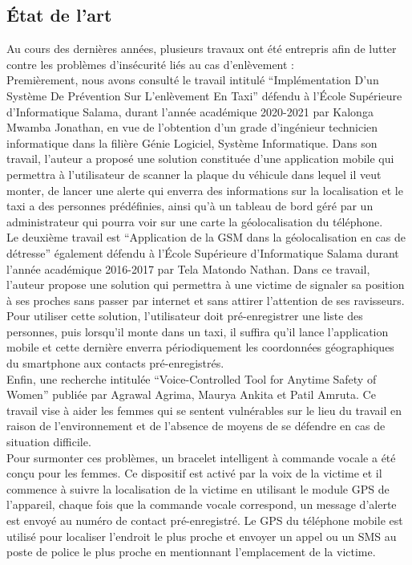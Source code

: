 \subsection{État de l'art}
Au cours des dernières années, plusieurs travaux ont été entrepris afin de lutter contre les problèmes d'insécurité liés au cas d'enlèvement : \\

Premièrement, nous avons consulté le travail intitulé “Implémentation D'un Système De Prévention Sur L'enlèvement En Taxi” défendu à l’École Supérieure d’Informatique Salama, durant l’année académique 2020-2021 par Kalonga Mwamba Jonathan, en vue de l’obtention d’un grade d’ingénieur technicien informatique dans la filière Génie Logiciel, Système Informatique. Dans son travail, l’auteur a proposé une solution constituée d’une application mobile qui permettra à l’utilisateur de scanner la plaque du véhicule dans lequel il veut monter, de lancer une alerte qui enverra des informations sur la localisation et le taxi a des personnes prédéfinies, ainsi qu'à un tableau de bord géré par un administrateur qui pourra voir sur une carte la géolocalisation du téléphone.\\

Le deuxième travail est “Application de la GSM dans la géolocalisation en cas de détresse” également défendu à l’École Supérieure d’Informatique Salama durant l’année académique 2016-2017 par Tela Matondo Nathan. Dans ce travail, l’auteur propose une solution qui permettra à une victime de signaler sa position à ses proches sans passer par internet et sans attirer l’attention de ses ravisseurs. Pour utiliser cette solution, l’utilisateur doit pré-enregistrer une liste des personnes, puis lorsqu’il monte dans un taxi, il suffira qu’il lance l’application mobile et cette dernière enverra périodiquement les coordonnées géographiques du smartphone aux contacts pré-enregistrés.\\

Enfin, une recherche intitulée “Voice-Controlled Tool for Anytime Safety of Women” publiée par Agrawal Agrima, Maurya Ankita et Patil Amruta. Ce travail vise à aider les femmes qui se sentent vulnérables sur le lieu du travail en raison de l'environnement et de l'absence de moyens de se défendre en cas de situation difficile.\\

Pour surmonter ces problèmes, un bracelet intelligent à commande vocale a été conçu pour les femmes. Ce dispositif est activé par la voix de la victime et il commence à suivre la localisation de la victime en utilisant le module GPS de l'appareil, chaque fois que la commande vocale correspond, un message d'alerte est envoyé au numéro de contact pré-enregistré. Le GPS du téléphone mobile est utilisé pour localiser l'endroit le plus proche et envoyer un appel ou un SMS au poste de police le plus proche en mentionnant l'emplacement de la victime.

